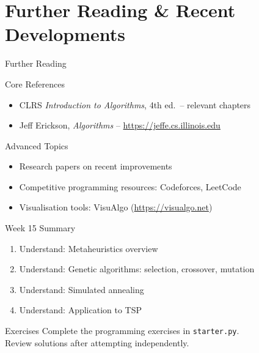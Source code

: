 \documentclass[aspectratio=169,xcolor=dvipsnames]{beamer}
\begin{document}
\section{Further Reading \& Recent Developments}
\begin{frame}{Further Reading}
  \begin{block}{Core References}
    \begin{itemize}
      \item CLRS \textit{Introduction to Algorithms}, 4th ed.\ -- relevant chapters
      \item Jeff Erickson, \textit{Algorithms} -- \url{https://jeffe.cs.illinois.edu}
    \end{itemize}
  \end{block}
  \begin{exampleblock}{Advanced Topics}
    \begin{itemize}
      \item Research papers on recent improvements
      \item Competitive programming resources: Codeforces, LeetCode
      \item Visualisation tools: VisuAlgo (\url{https://visualgo.net})
    \end{itemize}
  \end{exampleblock}
\end{frame}

\begin{frame}{Week 15 Summary}
  \begin{enumerate}
    \item Understand: Metaheuristics overview
    \item Understand: Genetic algorithms: selection, crossover, mutation
    \item Understand: Simulated annealing
    \item Understand: Application to TSP
  \end{enumerate}
  \begin{block}{Exercises}
    Complete the programming exercises in \texttt{starter.py}.\\
    Review solutions after attempting independently.
  \end{block}
\end{frame}
\end{document}

